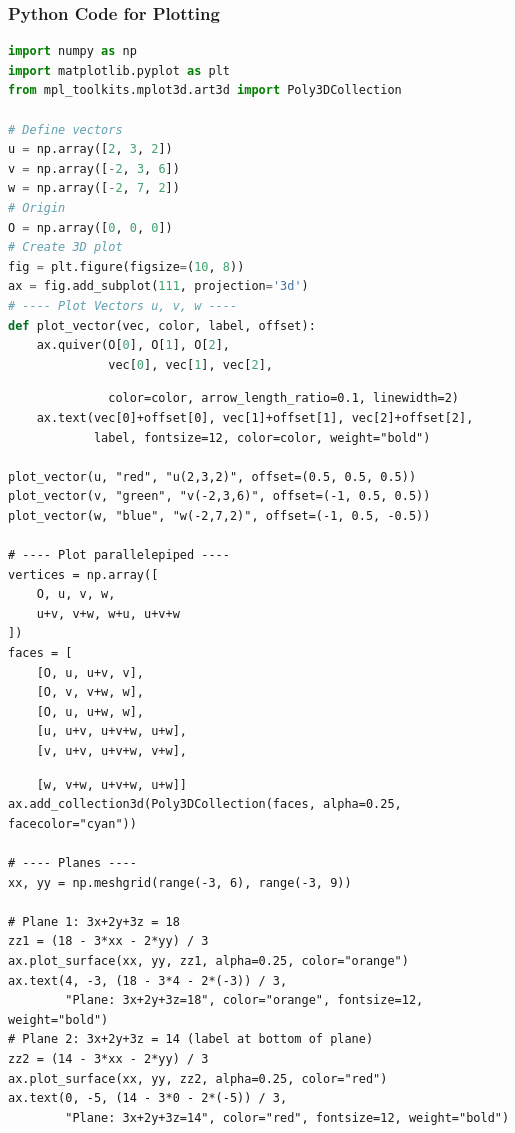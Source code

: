 \documentclass{beamer}
\theoremstyle{remark}
\numberwithin{equation}{section}
\begin{document}
\begin{frame}[fragile]
\frametitle{Python Code for Plotting}
\begin{lstlisting}[language=Python] 
import numpy as np
import matplotlib.pyplot as plt
from mpl_toolkits.mplot3d.art3d import Poly3DCollection

# Define vectors
u = np.array([2, 3, 2])
v = np.array([-2, 3, 6])
w = np.array([-2, 7, 2])
# Origin
O = np.array([0, 0, 0])
# Create 3D plot
fig = plt.figure(figsize=(10, 8))
ax = fig.add_subplot(111, projection='3d')
# ---- Plot Vectors u, v, w ----
def plot_vector(vec, color, label, offset):
    ax.quiver(O[0], O[1], O[2],
              vec[0], vec[1], vec[2],
 \end{lstlisting}
 \end{frame}
 \begin{frame}[fragile]
 \begin{lstlisting}
              color=color, arrow_length_ratio=0.1, linewidth=2)
    ax.text(vec[0]+offset[0], vec[1]+offset[1], vec[2]+offset[2],
            label, fontsize=12, color=color, weight="bold")

plot_vector(u, "red", "u(2,3,2)", offset=(0.5, 0.5, 0.5))
plot_vector(v, "green", "v(-2,3,6)", offset=(-1, 0.5, 0.5))
plot_vector(w, "blue", "w(-2,7,2)", offset=(-1, 0.5, -0.5))

# ---- Plot parallelepiped ----
vertices = np.array([
    O, u, v, w,
    u+v, v+w, w+u, u+v+w
])
faces = [
    [O, u, u+v, v],
    [O, v, v+w, w],
    [O, u, u+w, w],
    [u, u+v, u+v+w, u+w],
    [v, u+v, u+v+w, v+w],
\end{lstlisting}
\end{frame}
\begin{frame}[fragile]
\begin{lstlisting}
    [w, v+w, u+v+w, u+w]]
ax.add_collection3d(Poly3DCollection(faces, alpha=0.25, facecolor="cyan"))

# ---- Planes ----
xx, yy = np.meshgrid(range(-3, 6), range(-3, 9))

# Plane 1: 3x+2y+3z = 18
zz1 = (18 - 3*xx - 2*yy) / 3
ax.plot_surface(xx, yy, zz1, alpha=0.25, color="orange")
ax.text(4, -3, (18 - 3*4 - 2*(-3)) / 3,
        "Plane: 3x+2y+3z=18", color="orange", fontsize=12, weight="bold")
# Plane 2: 3x+2y+3z = 14 (label at bottom of plane)
zz2 = (14 - 3*xx - 2*yy) / 3
ax.plot_surface(xx, yy, zz2, alpha=0.25, color="red")
ax.text(0, -5, (14 - 3*0 - 2*(-5)) / 3,
        "Plane: 3x+2y+3z=14", color="red", fontsize=12, weight="bold")
\end{lstlisting}
\end{frame}
\end{document}
